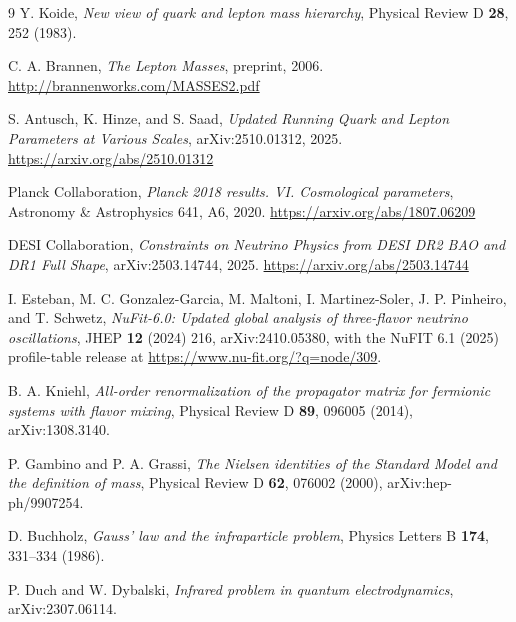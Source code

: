 \documentclass[11pt]{article}
\begin{document}
\begin{thebibliography}{9}
Y. Koide,
\emph{New view of quark and lepton mass hierarchy},
Physical Review D \textbf{28}, 252 (1983).

C. A. Brannen,
\emph{The Lepton Masses},
preprint, 2006.
\url{http://brannenworks.com/MASSES2.pdf}

S. Antusch, K. Hinze, and S. Saad,
\emph{Updated Running Quark and Lepton Parameters at Various Scales},
arXiv:2510.01312, 2025.
\url{https://arxiv.org/abs/2510.01312}

Planck Collaboration,
\emph{Planck 2018 results. VI. Cosmological parameters},
Astronomy \& Astrophysics 641, A6, 2020.
\url{https://arxiv.org/abs/1807.06209}

DESI Collaboration,
\emph{Constraints on Neutrino Physics from DESI DR2 BAO and DR1 Full Shape},
arXiv:2503.14744, 2025.
\url{https://arxiv.org/abs/2503.14744}

I. Esteban, M. C. Gonzalez-Garcia, M. Maltoni, I. Martinez-Soler, J. P. Pinheiro, and T. Schwetz,
\emph{NuFit-6.0: Updated global analysis of three-flavor neutrino oscillations},
JHEP \textbf{12} (2024) 216, arXiv:2410.05380,
with the NuFIT 6.1 (2025) profile-table release at
\url{https://www.nu-fit.org/?q=node/309}.

B. A. Kniehl,
\emph{All-order renormalization of the propagator matrix for fermionic systems
with flavor mixing},
Physical Review D \textbf{89}, 096005 (2014), arXiv:1308.3140.

P. Gambino and P. A. Grassi,
\emph{The Nielsen identities of the Standard Model and the definition of mass},
Physical Review D \textbf{62}, 076002 (2000), arXiv:hep-ph/9907254.

D. Buchholz,
\emph{Gauss' law and the infraparticle problem},
Physics Letters B \textbf{174}, 331--334 (1986).

P. Duch and W. Dybalski,
\emph{Infrared problem in quantum electrodynamics},
arXiv:2307.06114.

\end{thebibliography}
\end{document}
